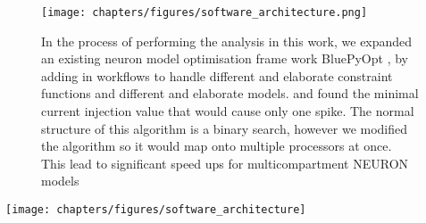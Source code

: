 \begin{figure}    
\begin{center}
\texttt{[image: chapters/figures/software\_architecture.png]}
\caption{In the process of performing the analysis in this work, we expanded an existing neuron model optimisation frame work BluePyOpt \cite{bluepyopt}, by adding in workflows to handle different and elaborate constraint functions and different and elaborate models. and found the minimal current injection value that would cause only one spike. The normal structure of this algorithm is a binary search, however we modified the algorithm so it would map onto multiple processors at once. This lead to significant speed ups for multicompartment NEURON models}

\end{center}
\end{figure}



\texttt{[image: chapters/figures/software\_architecture]}

